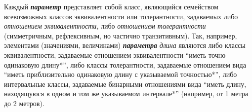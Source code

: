 \begin{SCn}
	
\begin{scnsubdividing}
\end{scnsubdividing}
\end{SCn}
Каждый \textbf{\textit{параметр}} представляет собой класс, являющийся семейством всевозможных классов эквивалентности или толерантности, задаваемых либо \textit{отношением эквивалентности}, либо \textit{отношением толерантности} (симметричным, рефлексивным, но частично транзитивным). Так, например, элементами (значениями, величинами) \textbf{\textit{параметра}} \textit{длина} являются либо классы эквивалентности, задаваемые отношением эквивалентности ``иметь точно одинаковую длину*'', либо классы толерантности, задаваемые отношением вида ``иметь приблизительно одинаковую длину с указываемой точностью*'', либо интервальные классы, задаваемые бинарными отношениями вида ``иметь длину, находящуюся в одном и том же указываемом интервале*'' (например, от 1 метра до 2 метров).


